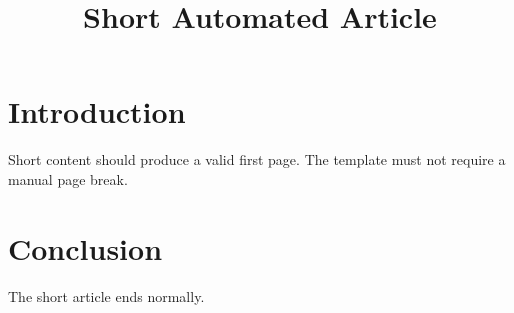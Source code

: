 \documentclass{tnqjournal}
\title{Short Automated Article}
\begin{document}
\maketitle
\section{Introduction}
Short content should produce a valid first page. The template must not require a manual page break.
\section{Conclusion}
The short article ends normally.
\end{document}
